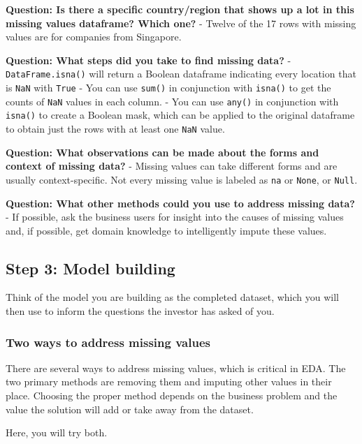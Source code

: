\documentclass[11pt]{article}
\begin{document}
    \textbf{Question: Is there a specific country/region that shows up a lot
in this missing values dataframe? Which one?} - Twelve of the 17 rows
with missing values are for companies from Singapore.

    \textbf{Question: What steps did you take to find missing data?} -
\texttt{DataFrame.isna()} will return a Boolean dataframe indicating
every location that is \texttt{NaN} with \texttt{True} - You can use
\texttt{sum()} in conjunction with \texttt{isna()} to get the counts of
\texttt{NaN} values in each column. - You can use \texttt{any()} in
conjunction with \texttt{isna()} to create a Boolean mask, which can be
applied to the original dataframe to obtain just the rows with at least
one \texttt{NaN} value.

    \textbf{Question: What observations can be made about the forms and
context of missing data?} - Missing values can take different forms and
are usually context-specific. Not every missing value is labeled as
\texttt{na} or \texttt{None}, or \texttt{Null}.

    \textbf{Question: What other methods could you use to address missing
data?} - If possible, ask the business users for insight into the causes
of missing values and, if possible, get domain knowledge to
intelligently impute these values.

    \hypertarget{step-3-model-building}{%
\subsection{Step 3: Model building}\label{step-3-model-building}}

Think of the model you are building as the completed dataset, which you
will then use to inform the questions the investor has asked of you.

    \hypertarget{two-ways-to-address-missing-values}{%
\subsubsection{Two ways to address missing
values}\label{two-ways-to-address-missing-values}}

There are several ways to address missing values, which is critical in
EDA. The two primary methods are removing them and imputing other values
in their place. Choosing the proper method depends on the business
problem and the value the solution will add or take away from the
dataset.

Here, you will try both.
\end{document}
